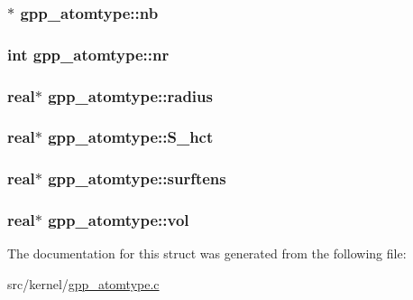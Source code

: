 \hypertarget{structgpp__atomtype_ab88cd9092ea5995b7f8b497b12da6aae}{
\subsubsection[{nb}]{$\ast$ {\bf gpp\-\_\-atomtype\-::nb}}}\label{structgpp__atomtype_ab88cd9092ea5995b7f8b497b12da6aae}
\hypertarget{structgpp__atomtype_ab8b30563c4371f14e7853178454308e3}{
\subsubsection[{nr}]{\setlength{\rightskip}{0pt plus 5cm}int {\bf gpp\-\_\-atomtype\-::nr}}}\label{structgpp__atomtype_ab8b30563c4371f14e7853178454308e3}
\hypertarget{structgpp__atomtype_a1357ea84a180da89f85a6f85ba424819}{
\subsubsection[{radius}]{\setlength{\rightskip}{0pt plus 5cm}real$\ast$ {\bf gpp\-\_\-atomtype\-::radius}}}\label{structgpp__atomtype_a1357ea84a180da89f85a6f85ba424819}
\hypertarget{structgpp__atomtype_ae8162419cbd224a1a75ca5b44986680e}{
\subsubsection[{\-S\-\_\-hct}]{\setlength{\rightskip}{0pt plus 5cm}real$\ast$ {\bf gpp\-\_\-atomtype\-::\-S\-\_\-hct}}}\label{structgpp__atomtype_ae8162419cbd224a1a75ca5b44986680e}
\hypertarget{structgpp__atomtype_a98a8c474d8c73721fa44705fefdd77b6}{
\subsubsection[{surftens}]{\setlength{\rightskip}{0pt plus 5cm}real$\ast$ {\bf gpp\-\_\-atomtype\-::surftens}}}\label{structgpp__atomtype_a98a8c474d8c73721fa44705fefdd77b6}
\hypertarget{structgpp__atomtype_a03c8966807be6989d11caa3be503bf47}{
\subsubsection[{vol}]{\setlength{\rightskip}{0pt plus 5cm}real$\ast$ {\bf gpp\-\_\-atomtype\-::vol}}}\label{structgpp__atomtype_a03c8966807be6989d11caa3be503bf47}


\-The documentation for this struct was generated from the following file\-:\begin{DoxyCompactItemize}
\item 
src/kernel/\hyperlink{gpp__atomtype_8c}{gpp\-\_\-atomtype.\-c}\end{DoxyCompactItemize}

